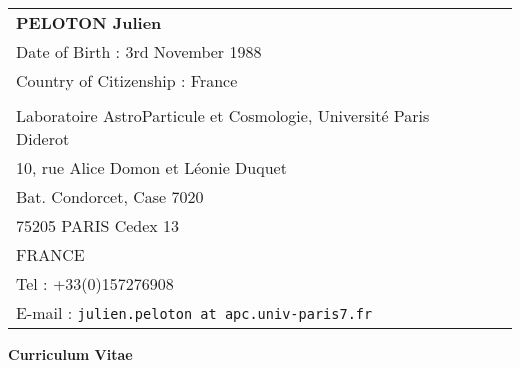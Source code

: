 \documentclass[a4paper,oneside]{article}
\newcommand{\interRubrique}{\bigskip}
\newcommand{\styleRub}[1]{\noindent\textbf{\large #1}\par}
\newcommand{\indentStd}{\noindent\hspace{\lenA}}
\newcommand{\mytitle}[1]{
    \begin{center}
    {\large{\textbf{#1}\ }}
    \end{center}
}
\newenvironment{header}[2][\linewidth] {
    \styleRub{#2}
    \setlength{\lenB}{#1}
    \setlength{\lenC}{\linewidth}
    \addtolength{\lenC}{-\lenA}
    \addtolength{\lenC}{-\lenB}
    \addtolength{\lenC}{-\parindent}
    \addtolength{\lenC}{-9pt}
    \indentStd\begin{tabular}[t]{p{\lenB}ll}
}
{\end{tabular}}
\begin{document}
\newlength{\lenA} %
\setlength{\lenA}{0.cm}
\newlength{\lenB} %
\newlength{\lenC} %




\begin{header}[14cm]{}		
    \textbf{PELOTON Julien} \\
    \footnotesize {Date of Birth : 3rd November 1988} \\
    \footnotesize{Country of Citizenship : France} \\
    \footnotesize{ } \\
    \footnotesize{Laboratoire AstroParticule et Cosmologie, Universit\'e Paris Diderot} \\
    \footnotesize{10, rue Alice Domon et L\'eonie Duquet} \\
    \footnotesize{Bat. Condorcet, Case 7020} \\
    \footnotesize{75205 PARIS Cedex 13} \\
    \footnotesize{FRANCE} \\
    \footnotesize{Tel : +33(0)157276908} \\
    \footnotesize{E-mail : \texttt{julien.peloton at apc.univ-paris7.fr}} \\	
\end{header}

\interRubrique
\interRubrique

\mytitle{Curriculum Vitae}

\interRubrique




\interRubrique
\end{document}

